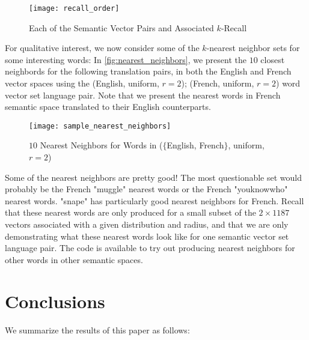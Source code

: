 \documentclass[12pt, usenames]{article}
\theoremstyle{definition}
\theoremstyle{definition}
\theoremstyle{definition}
\begin{document}
\begin{figure}
\texttt{[image: recall\_order]}
\centering
\caption{Each of the Semantic Vector Pairs and Associated $k$-Recall}
\label{fig:recall_order}
\end{figure}

For qualitative interest, we now consider some of the $k$-nearest neighbor sets for some interesting words: In \autoref{fig:nearest_neighbors}, we present the $10$ closest neighbords for the following translation pairs, in both the English and French vector spaces using the (English, uniform, $r = 2$); (French, uniform, $r = 2$) word vector set language pair. Note that we present the nearest words in French semantic space translated to their English counterparts.
\begin{figure}
\texttt{[image: sample\_nearest\_neighbors]}
\centering
\caption{$10$ Nearest Neighbors for Words in ($\{$English, French$\}$, uniform, $r = 2$)}
\label{fig:nearest_neighbors}
\end{figure}

Some of the nearest neighbors are pretty good! The most questionable set would probably be the French "muggle" nearest words or the French "youknowwho" nearest words. "snape" has particularly good nearest neighbors for French. Recall that these nearest words are only produced for a small subset of the $2 \times1187$ vectors associated with a given distribution and radius, and that we are only demonstrating what these nearest words look like for one semantic vector set language pair. The code is available to try out producing nearest neighbors for other words in other semantic spaces.  

\section{Conclusions}

We summarize the results of this paper as follows: 
\end{document}
